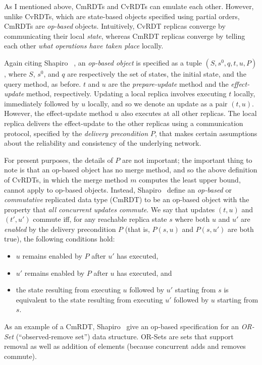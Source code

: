 \documentclass{article}
\begin{document}
As I mentioned above, CmRDTs and CvRDTs can emulate each other.
However, unlike CvRDTs, which are state-based objects specified using
partial orders, CmRDTs are \emph{op-based} objects.  Intuitively,
CvRDT replicas converge by communicating their local \emph{state},
whereas CmRDT replicas converge by telling each other \emph{what
  operations have taken place} locally.

Again citing Shapiro \etal~\cite{crdts, crdts-tr}, an \emph{op-based
  object} is specified as a tuple $(S, s^0, q, t, u, P)$, where $S$,
$s^0$, and $q$ are respectively the set of states, the initial state,
and the query method, as before. $t$ and $u$ are the
\emph{prepare-update} method and the \emph{effect-update} method,
respectively.  Updating a local replica involves executing $t$
locally, immediately followed by $u$ locally, and so we denote an
update as a pair $(t, u)$.  However, the effect-update method $u$ also
executes at all other replicas.  The local replica delivers the
effect-update to the other replicas using a communication protocol,
specified by the \emph{delivery precondition} $P$, that makes certain
assumptions about the reliability and consistency of the underlying
network.

For present purposes, the details of $P$ are not important; the
important thing to note is that an op-based object has no merge
method, and so the above definition of CvRDTs, in which the merge
method $m$ computes the least upper bound, cannot apply to op-based
objects.  Instead, Shapiro \etal~define an \emph{op-based} or
\emph{commutative} replicated data type (CmRDT) to be an op-based
object with the property that \emph{all concurrent updates commute}.
We say that updates $(t, u)$ and $(t', u')$ commute iff, for any
reachable replica state $s$ where both $u$ and $u'$ are \emph{enabled}
by the delivery precondition $P$ (that is, $P(s, u)$ and $P(s, u')$
are both true), the following conditions hold:
\begin{itemize}
  \item $u$ remains enabled by $P$ after $u'$ has executed,
  \item $u'$ remains enabled by $P$ after $u$ has executed, and
  \item the state resulting from executing $u$ followed by $u'$
    starting from $s$ is equivalent to the state resulting from
    executing $u'$ followed by $u$ starting from $s$.
\end{itemize}
As an example of a CmRDT, Shapiro \etal~give an op-based specification
for an \emph{OR-Set} (``observed-remove set'') data structure.
OR-Sets are sets that support removal as well as addition of elements
(because concurrent adds and removes commute).
\end{document}
